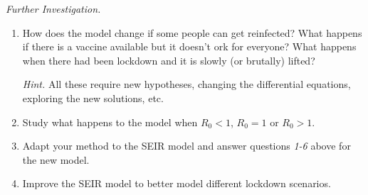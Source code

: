 \emph{Further Investigation. } 
\begin{enumerate}[label=\emph{\arabic*.}]
\item How does the model change if some people can get reinfected? What happens if there is a vaccine available but it doesn't ork for everyone? What happens when there had been lockdown and it is slowly (or brutally) lifted?
	
	\emph{Hint.} All these require new hypotheses, changing the differential equations, exploring the new solutions, etc.

\item Study what happens to the model when $R_0<1$, $R_0=1$ or $R_0>1$.
\item Adapt your method to the SEIR model and answer questions \emph{1-6} above for the new model.
\item Improve the SEIR model to better model different lockdown scenarios.

\end{enumerate}

\begin{noexercises}
\end{noexercises}

